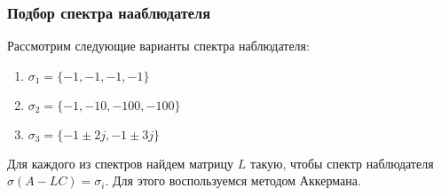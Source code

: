 \subsubsection{Подбор спектра нааблюдателя}
Рассмотрим следующие варианты спектра наблюдателя:
\begin{enumerate}
    \item  $\sigma_1 = \{-1, -1, -1, -1\}$
    \item $\sigma_2 = \{-1, -10, -100, -100\}$
    \item $\sigma_3 = \{-1\pm2j, -1\pm3j\}$
\end{enumerate}
Для каждого из спектров найдем матрицу $L$ такую, чтобы спектр наблюдателя $\sigma(A - LC) = \sigma_i$. Для этого 
воспользуемся методом Аккермана. 


